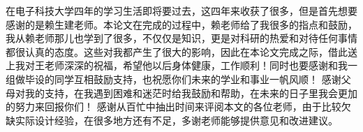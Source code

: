 
在电子科技大学四年的学习生活即将要过去，这四年来收获了很多，但是首先想要感谢的是赖生建老师。本论文在完成的过程中，赖老师给了我很多的指点和鼓励，我从赖老师那儿也学到了很多，不仅仅是知识，更是对科研的热爱和对待任何事情都很认真的态度。这些对我都产生了很大的影响，因此在本论文完成之际，借此送上我对王老师深深的祝福，希望他以后身体健康，工作顺利！同时也要感谢和我一组做毕设的同学互相鼓励支持，也祝愿你们未来的学业和事业一帆风顺！
感谢父母对我的支持，在我遇到困难和迷茫时给我鼓励和帮助，在未来的日子里我会更加的努力来回报你们！
感谢从百忙中抽出时间来评阅本文的各位老师，由于比较欠缺实际设计经验，在很多地方还有不足，多谢老师能够提供意见和改进建议。
